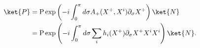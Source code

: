 \begin{equation}
\begin{split}
 \ket{P} &=\mbox{P}\exp \left( -i \int^{\pi}_0 
    d \sigma A_+(X^+,X^i)  \partial_{\sigma} X^+ \right) \ket{N}  \\
 & =  \mbox{P} \exp \left( -i \int^{\pi}_0 
    d \sigma \sum_i h_i (X^+) \partial_{\sigma} X^+  X^i X^i  \right) 
    \ket{N} .
\end{split}
\end{equation}

